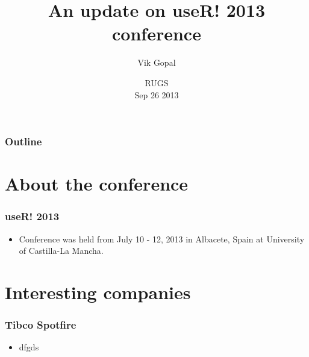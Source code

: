 \documentclass{beamer}
\title[useR! 2013] %
{An update on useR! 2013 conference}
\author %
{Vik Gopal}
\date %
{RUGS\\Sep 26 2013}
\begin{document}
\begin{frame}
  \titlepage
\end{frame}

\begin{frame}
  \frametitle{Outline}
  \tableofcontents
\end{frame}





\section{About the conference}
\begin{frame}[t]
  \frametitle{useR! 2013}
\begin{itemize}
  \item Conference was held from July 10 - 12, 2013 in Albacete, Spain at
    University of Castilla-La Mancha.
\end{itemize}
\begin{center}
\end{center}
\begin{center}
\end{center}
\end{frame}

\section{Interesting companies}
\begin{frame}[label=current]
  \frametitle{Tibco Spotfire}
  \begin{itemize}
  \item dfgds
  \end{itemize}
\end{frame}
\end{document}
